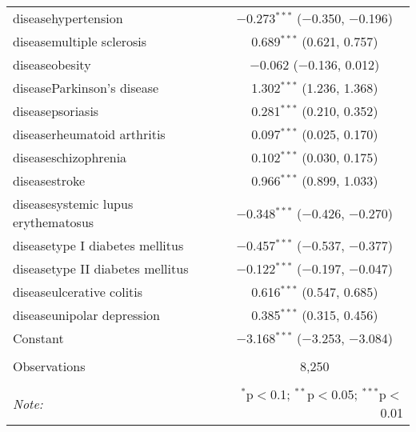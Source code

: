 \begin{table}[!htbp]
\begin{tabular}{@{\extracolsep{5pt}}lc}
  diseasehypertension & $-$0.273$^{***}$ ($-$0.350, $-$0.196) \\ 
  diseasemultiple sclerosis & 0.689$^{***}$ (0.621, 0.757) \\ 
  diseaseobesity & $-$0.062 ($-$0.136, 0.012) \\ 
  diseaseParkinson's disease & 1.302$^{***}$ (1.236, 1.368) \\ 
  diseasepsoriasis & 0.281$^{***}$ (0.210, 0.352) \\ 
  diseaserheumatoid arthritis & 0.097$^{***}$ (0.025, 0.170) \\ 
  diseaseschizophrenia & 0.102$^{***}$ (0.030, 0.175) \\ 
  diseasestroke & 0.966$^{***}$ (0.899, 1.033) \\ 
  diseasesystemic lupus erythematosus & $-$0.348$^{***}$ ($-$0.426, $-$0.270) \\ 
  diseasetype I diabetes mellitus & $-$0.457$^{***}$ ($-$0.537, $-$0.377) \\ 
  diseasetype II diabetes mellitus & $-$0.122$^{***}$ ($-$0.197, $-$0.047) \\ 
  diseaseulcerative colitis & 0.616$^{***}$ (0.547, 0.685) \\ 
  diseaseunipolar depression & 0.385$^{***}$ (0.315, 0.456) \\ 
  Constant & $-$3.168$^{***}$ ($-$3.253, $-$3.084) \\ 
 \hline \\[-1.8ex] 
Observations & 8,250 \\ 
\hline 
\hline \\[-1.8ex] 
\textit{Note:}  & \multicolumn{1}{r}{$^{*}$p$<$0.1; $^{**}$p$<$0.05; $^{***}$p$<$0.01} \\ 
\end{tabular} 
\end{table} 
